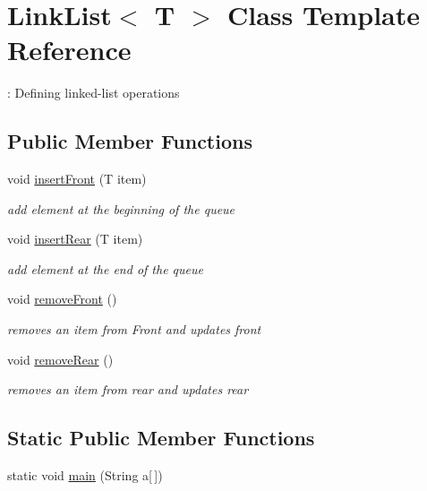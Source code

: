 \hypertarget{classLinkList}{}\section{Link\+List$<$ T $>$ Class Template Reference}
\label{classLinkList}


\+: Defining linked-\/list operations  


\subsection*{Public Member Functions}
\begin{DoxyCompactItemize}
\item 
void \hyperlink{classLinkList_a38b2e77462f2733bc9254c3fd86b453f}{insert\+Front} (T item)
\begin{DoxyCompactList}\small\item\em add element at the beginning of the queue \end{DoxyCompactList}\item 
void \hyperlink{classLinkList_af0f013b563ae0abaec5c22037ec31e28}{insert\+Rear} (T item)
\begin{DoxyCompactList}\small\item\em add element at the end of the queue \end{DoxyCompactList}\item 
void \hyperlink{classLinkList_ae4d698669105fff350b578de53e7e389}{remove\+Front} ()\hypertarget{classLinkList_ae4d698669105fff350b578de53e7e389}{}\label{classLinkList_ae4d698669105fff350b578de53e7e389}

\begin{DoxyCompactList}\small\item\em removes an item from Front and updates front \end{DoxyCompactList}\item 
void \hyperlink{classLinkList_af7894809851c2478fdb3272bd0584b6c}{remove\+Rear} ()\hypertarget{classLinkList_af7894809851c2478fdb3272bd0584b6c}{}\label{classLinkList_af7894809851c2478fdb3272bd0584b6c}

\begin{DoxyCompactList}\small\item\em removes an item from rear and updates rear \end{DoxyCompactList}\end{DoxyCompactItemize}
\subsection*{Static Public Member Functions}
\begin{DoxyCompactItemize}
\item 
static void \hyperlink{classLinkList_a62eb2e6bd32c8bdaa9bd26b5cef6c2c8}{main} (String a\mbox{[}$\,$\mbox{]})
\end{DoxyCompactItemize}


